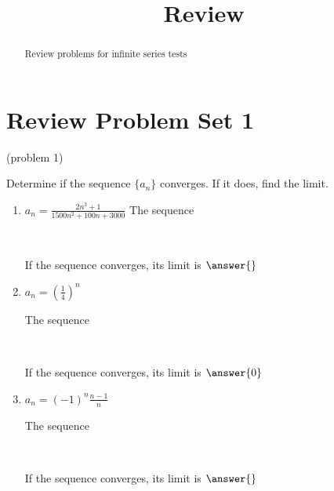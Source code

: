 \documentclass[handout]{ximera}
\title{Review}
\begin{document}
\begin{abstract}
Review problems for infinite series tests
\end{abstract}

\maketitle

\section{Review Problem Set 1}



\begin{problem}(problem 1)

Determine if the sequence $\{a_n\}$ converges.  If it does, find the limit.

\begin{enumerate}


\item $a_n = \frac{2n^3 + 1}{1500n^2 + 100n + 3000}$
The sequence 
\begin{multipleChoice}
\\
\end{multipleChoice}

If the sequence converges, its limit is $\answer{}$

\item $a_n = \left(\frac{1}{4}\right)^n$

The sequence 
\begin{multipleChoice}
\\
\end{multipleChoice}

If the sequence converges, its limit is $\answer{0}$




\item $a_n = (-1)^n\frac{ n - 1}{n}$

The sequence 
\begin{multipleChoice}
\\
\end{multipleChoice}

If the sequence converges, its limit is $\answer{}$

\end{enumerate}

\end{problem}
\end{document}
